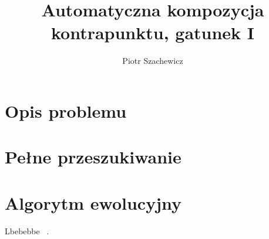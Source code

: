 \documentclass{article}
\title{Automatyczna kompozycja kontrapunktu, gatunek I}
\author{Piotr Szachewicz}
\begin{document}
\maketitle

\section{Opis problemu}

\section{Pełne przeszukiwanie}

\section{Algorytm ewolucyjny}

Lbebebbe ~\cite{Gawlas}.




\end{document}
